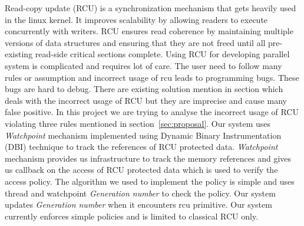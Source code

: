 Read-copy update (RCU) is a synchronization mechanism that gets heavily used in the linux kernel. It improves scalability by allowing readers to execute concurrently with writers. RCU ensures read coherence by maintaining multiple versions of data structures and ensuring that they are not freed until all pre-existing read-side critical sections complete. Using RCU for developing parallel system is complicated and requires lot of care. The user need to follow many rules or assumption and incorrect usage of rcu leads to programming bugs. These bugs are hard to debug. There are existing solution mention in section which deals with the incorrect usage of RCU but they are imprecise and cause many false positive.  In this project we are trying to analyse the incorrect usage of RCU violating three rules mentioned in section~\ref{sec:proposal}. Our system uses \emph{Watchpoint} mechanism implemented using Dynamic Binary Instrumentation (DBI) technique to track the references of RCU protected data. \emph{Watchpoint} mechanism provides us infrastructure to track the memory references and gives us callback on the access of RCU protected data which is used to verify the access policy. The algorithm we used to implement the policy is simple and uses thread and watchpoint \emph{Generation number} to check the policy.  Our system updates \emph{Generation number} when it encounters rcu primitive. Our system currently enforces simple policies and is limited to classical RCU only. 

